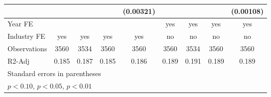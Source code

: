 \begin{table}[htbp]
\begin{tabular}{l*{8}{c}}
                    &                     &                     &                     &   (0.00321)         &                     &                     &                     &   (0.00108)         \\
\hline
Year FE             &                     &                     &                     &                     &         yes         &         yes         &         yes         &         yes         \\
Industry FE         &         yes         &         yes         &         yes         &         yes         &          no         &          no         &          no         &          no         \\
Observations        &        3560         &        3534         &        3560         &        3560         &        3560         &        3534         &        3560         &        3560         \\
R2-Adj              &       0.185         &       0.187         &       0.185         &       0.186         &       0.189         &       0.191         &       0.189         &       0.189         \\
\hline\hline
\multicolumn{9}{l}{\footnotesize Standard errors in parentheses}\\
\multicolumn{9}{l}{\footnotesize \sym{*} \(p<0.10\), \sym{**} \(p<0.05\), \sym{***} \(p<0.01\)}\\
\end{tabular}
\end{table}
